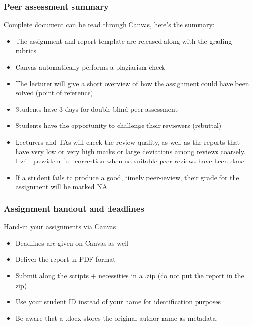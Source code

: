  \begin{frame}
  \frametitle{Peer assessment summary}
  Complete document can be read through Canvas, here's the summary:
  \begin{itemize}
    \item The assignment and report template are released along with the grading rubrics
    \item Canvas automatically performs a plagiarism check
    \item The lecturer will give a short overview of how the assignment could have been solved (point of reference)
    \item Students have 3 days for double-blind peer assessment
    \item Students have the opportunity to challenge their reviewers (rebuttal)
    \item Lecturers and TAs will check the review quality, as well as the reports that have very low or very high marks or large deviations among reviews coarsely. I will provide a full correction when no suitable peer-reviews have been done.
    \item If a student fails to produce a good, timely peer-review, their grade for the assignment will be marked NA.
  \end{itemize}
 \end{frame}
%
\begin{frame}
 \frametitle{Assignment handout and deadlines}
     Hand-in your assignments via Canvas
    \begin{itemize}
      \item Deadlines are given on Canvas as well
      \item Deliver the report in PDF format
      \item Submit along the scripts + necessities in a .zip (do not put the report in the zip)
      \item Use your student ID instead of your name for identification purposes
      \item Be aware that a .docx stores the original author name as metadata.
    \end{itemize}
\end{frame}

